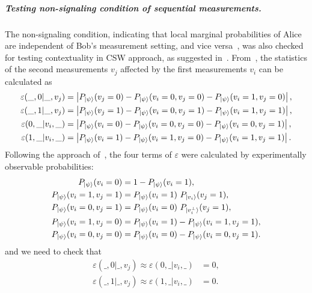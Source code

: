 \documentclass[pra,aps,notitlepage,superscriptaddress,showpacs,showkeys]{revtex4-1}
\theoremstyle{definition}
\theoremstyle{remark}
\begin{document}
 \subparagraph{Testing non-signaling condition of sequential measurements.}
 The non-signaling condition, indicating that local marginal probabilities of Alice are independent of Bob's measurement setting, and vice versa~\cite{Brunner14}, was also checked for testing contextuality in CSW approach, as suggested in~\cite{cabello16s, yxiao17s}.
 From~\cite{cabello16s}, the statistics of the second measurements $v_j$ affected by the first measurements $v_i$ can be calculated as
 \begin{subequations}
    \begin{align}
        \varepsilon(\_, 0|\_, v_j) &= \left| P_{\ket{\psi}} (v_j = 0) - P_{\ket{\psi}} (v_i = 0, v_j = 0) - P_{\ket{\psi}} (v_i = 1, v_j = 0) \right|, \\
        \varepsilon(\_, 1|\_, v_j) &= \left| P_{\ket{\psi}} (v_j = 1) - P_{\ket{\psi}} (v_i = 0, v_j = 1) - P_{\ket{\psi}} (v_i = 1, v_j = 1) \right|, \\
        \varepsilon(0, \_|v_i, \_) &= \left| P_{\ket{\psi}} (v_i = 0) - P_{\ket{\psi}} (v_i = 0, v_j = 0) - P_{\ket{\psi}} (v_i = 0, v_j = 1) \right|, \\
        \varepsilon(1, \_|v_i, \_) &= \left| P_{\ket{\psi}} (v_i = 1) - P_{\ket{\psi}} (v_i = 1, v_j = 0) - P_{\ket{\psi}} (v_i = 1, v_j = 1) \right|.
    \end{align}
 \end{subequations}
Following the approach of~\cite{yxiao17s}, the four terms of $\varepsilon$  were calculated by experimentally observable probabilities:
 \begin{subequations}
    \begin{align}
        P_{\ket{\psi}} (v_i = 0) &= 1 - P_{\ket{\psi}} (v_i = 1),  \label{eq:averta}\\
        P_{\ket{\psi}} (v_i = 1, v_j = 1) &= P_{\ket{\psi}} (v_i = 1) ~ P_{\ket{v_i}} (v_j = 1), \label{eq:avertb}\\
        P_{\ket{\psi}} (v_i = 0, v_j = 1) &= P_{\ket{\psi}} (v_i = 0) ~ P_{\ket{v_i^\perp}} (v_j = 1),\label{eq:avertc} \\
        P_{\ket{\psi}} (v_i = 1, v_j = 0) &= P_{\ket{\psi}} (v_i = 1) - P_{\ket{\psi}} (v_i = 1, v_j = 1),\label{eq:avertd} \\
        P_{\ket{\psi}} (v_i = 0, v_j = 0) &= P_{\ket{\psi}} (v_i = 0) - P_{\ket{\psi}} (v_i = 0, v_j = 1).\label{eq:averte}
    \end{align}
 \end{subequations}
 and we need to check that
 \begin{subequations}
    \begin{align}
        \varepsilon(\_, 0|\_, v_j) \approx \varepsilon(0, \_|v_i, \_) &= 0, \\
        \varepsilon(\_, 1|\_, v_j) \approx \varepsilon(1, \_|v_i, \_) &= 0.
    \end{align}
    \label{eq:epsij}
 \end{subequations}
\end{document}
